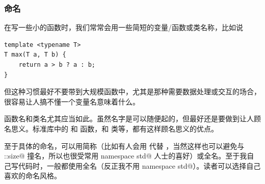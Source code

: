 \subsubsection*{命名}
在写一些小的函数时，我们常常会用一些简短的变量/函数或类名称，比如说
\begin{lstlisting}
template <typename T>
T max(T a, T b) {
    return a > b ? a : b;
}
\end{lstlisting}
但这种习惯最好不要带到大规模函数中，尤其是那种需要数据处理或交互的场合，很容易让人搞不懂一个变量名意味着什么。\par
函数名和类名尤其应当如此。虽然名字是可以随便起的，但最好还是要做到让人顾名思义。标准库中的 \lstinline@max@ 和 \lstinline@strlen@ 函数，\lstinline@string@ 和 \lstinline@list@ 类等，都有这样顾名思义的优点。\par
至于具体的命名，可以用简称（比如有人会用 \lstinline@siz@ 代替 \lstinline@size@，当然这样也可以避免与 \lstinline@std::size@ 撞名，所以也很受常用 \lstinline@using namespace std@ 人士的喜好）或全名。至于我自己写代码时，一般都使用全名（反正我不用 \lstinline@using namespace std@）。读者可以选择自己喜欢的命名风格。

